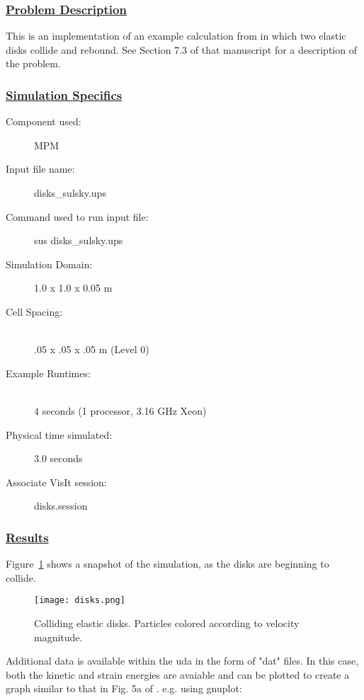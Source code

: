 \subsubsection*{\underline{Problem Description}}
This is an implementation of an example calculation from \cite{sulskycmame} in
which two elastic disks collide and rebound.  See Section 7.3 of that
manuscript for a description of the problem.
 
\subsubsection*{\underline{Simulation Specifics}}
\begin{description} 
\item [Component used:] \hfill MPM
\item [Input file name:] \hfill disks\_sulsky.ups
\item [Command used to run input file:]\hfill sus disks\_sulsky.ups
\item [Simulation Domain:]\hfill    1.0 x 1.0 x 0.05 m

\item [Cell Spacing:]\hfill \\ 
.05 x .05 x .05 m (Level 0)

\item [Example Runtimes:] \hfill \\
 4 seconds  (1 processor, 3.16 GHz Xeon)\\

\item [Physical time simulated:] \hfill 3.0 seconds

\item [Associate VisIt session:] \hfill disks.session

\end{description}

\subsubsection*{\underline{Results}}

Figure~\ref{figdisks} shows a snapshot of the simulation, as the disks
are beginning to collide.
\begin{figure}
  \center
  \texttt{[image: disks.png]}
  \caption{Colliding elastic disks.  Particles colored according to
velocity magnitude.}
  \label{figdisks}
\end{figure}

Additional data is available within the uda in the form of "dat" files.
In this case, both the kinetic and strain energies are avaiable and can
be plotted to create a graph similar to that in Fig. 5a of \cite{sulskycmame}.
e.g. using gnuplot:

